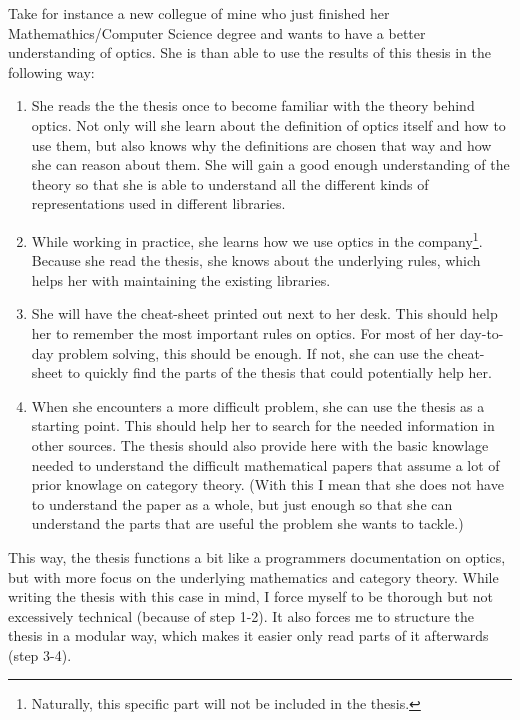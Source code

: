 \documentclass{article}
\begin{document}
Take for instance a new collegue of mine who just finished her Mathemathics/Computer Science degree and wants to have a better understanding of optics. She is than able to use the results of this thesis in the following way:
\begin{enumerate}
    \item She reads the the thesis once to become familiar with the theory behind optics. Not only will she learn about the definition of optics itself and how to use them, but also knows why the definitions are chosen that way and how she can reason about them. She will gain a good enough understanding of the theory so that she is able to understand all the different kinds of representations used in different libraries.
    \item While working in practice, she learns how we use optics in the company\footnote{Naturally, this specific part will not be included in the thesis.}. Because she read the thesis, she knows about the underlying rules, which helps her with maintaining the existing libraries.
    \item She will have the cheat-sheet printed out next to her desk. This should help her to remember the most important rules on optics. For most of her day-to-day problem solving, this should be enough. If not, she can use the cheat-sheet to quickly find the parts of the thesis that could potentially help her.
    \item When she encounters a more difficult problem, she can use the thesis as a starting point. This should help her to search for the needed information in other sources. The thesis should also provide here with the basic knowlage needed to understand the difficult mathematical papers that assume a lot of prior knowlage on category theory. (With this I mean that she does not have to understand the paper as a whole, but just enough so that she can understand the parts that are useful the problem she wants to tackle.)
\end{enumerate}
This way, the thesis functions a bit like a programmers documentation on optics, but with more focus on the underlying mathematics and category theory. While writing the thesis with this case in mind, I force myself to be thorough but not excessively technical (because of step 1-2). It also forces me to structure the thesis in a modular way, which makes it easier only read parts of it afterwards (step 3-4).

\bigskip
\end{document}
